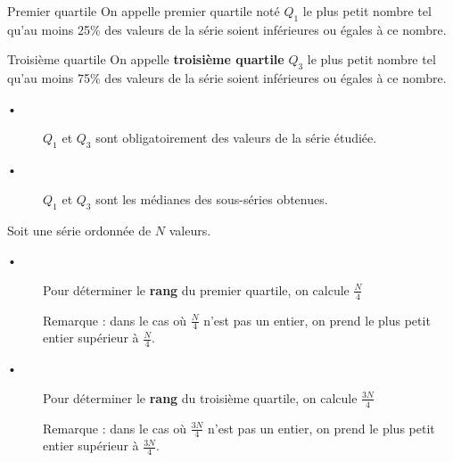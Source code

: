 \begin{DefT}{Premier quartile}
On appelle premier quartile noté $Q_1$ le plus petit nombre tel qu'au moins 25\% des valeurs de la série
soient inférieures ou égales à ce nombre.
\end{DefT}


\begin{DefT}{Troisième quartile}
On appelle \textbf{troisième quartile} $Q_3$ le plus petit nombre tel qu'au moins 75\% des valeurs de la série
soient inférieures ou égales à ce nombre.
\end{DefT}


\begin{Rq}
\begin{description}
\item[•] $Q_1$ et $Q_3$ sont obligatoirement des valeurs de la série étudiée.
\item[•] $Q_1$ et $Q_3$ sont les médianes des sous-séries obtenues.
\end{description}
\end{Rq}


\begin{Mt}
Soit une série ordonnée de $N$ valeurs.
\begin{description}
\item[•] Pour déterminer le \textbf{rang} du premier quartile, on calcule $\frac{N}{4}$

Remarque : dans le cas où $\frac{N}{4}$ n'est pas un entier, on prend le plus petit entier supérieur à $\frac{N}{4}$.

\item[•] Pour déterminer le \textbf{rang} du troisième quartile, on calcule $\frac{3N}{4}$

Remarque : dans le cas où $\frac{3N}{4}$ n'est pas un entier, on prend le plus petit entier supérieur à $\frac{3N}{4}$.
\end{description}
\end{Mt}









